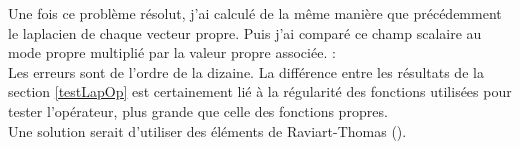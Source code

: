 Une fois ce problème résolut, j'ai calculé de la même manière que précédemment le laplacien de chaque vecteur propre. Puis j'ai comparé ce champ scalaire au mode propre multiplié par la valeur propre associée. :\\


Les erreurs sont de l'ordre de la dizaine. La différence entre les résultats de la section \ref{testLapOp} est certainement lié à la régularité des fonctions utilisées pour tester l'opérateur, plus grande que celle des fonctions propres.\\
Une solution serait d'utiliser des éléments de Raviart-Thomas (\cite{Raviart77}).


